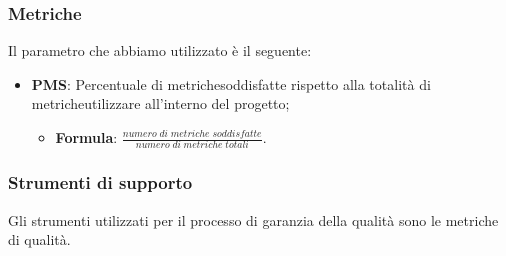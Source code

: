 \subsubsection{Metriche} %
Il parametro che abbiamo utilizzato è il seguente:
	\begin{itemize}
		\item \textbf{PMS}: Percentuale di metriche\glosp soddisfatte rispetto alla totalità di metriche\glosp utilizzare all'interno del progetto\glo;
		\begin{itemize}
			\item[] \textbf{Formula}: $\frac{numero \; di \; metriche \; soddisfatte}{numero \; di \; metriche \; totali}$.
		\end{itemize}
	\end{itemize}
\subsubsection{Strumenti di supporto}
Gli strumenti utilizzati per il processo di garanzia della qualità sono le metriche di qualità.
